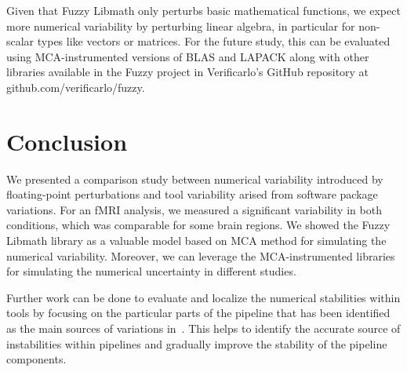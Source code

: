 \documentclass[conference]{IEEEtran}
\begin{document}
Given that Fuzzy Libmath only perturbs basic mathematical functions, we expect more numerical variability by perturbing linear algebra,
in particular for non-scalar types like vectors or matrices. For the future study, this can be evaluated using MCA-instrumented versions
of BLAS and LAPACK along with other libraries available in the Fuzzy project in Verificarlo's GitHub repository at github.com/verificarlo/fuzzy.


\section{Conclusion}

We presented a comparison study between numerical variability introduced by floating-point perturbations and tool variability arised from software package variations.
For an fMRI analysis, we measured a significant variability in both conditions, which was comparable for some brain regions.
We showed the Fuzzy Libmath library as a valuable model based on MCA method for simulating the numerical variability.
Moreover, we can leverage the MCA-instrumented libraries for simulating the numerical uncertainty in different studies.

Further work can be done to evaluate and localize the numerical stabilities within tools by focusing on the particular parts of
the pipeline that has been identified as the main sources of variations in~\cite{bowring2021isolating}.
This helps to identify the accurate source of instabilities within pipelines and gradually improve the stability of the pipeline components.



\end{document}
